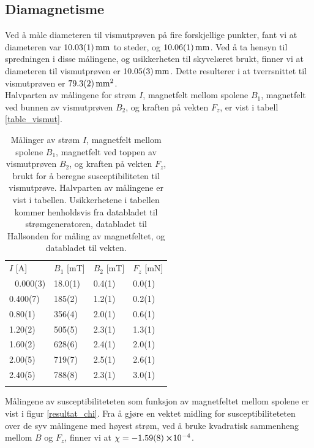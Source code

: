 \documentclass[%
 reprint,
 amsmath,amssymb,
 aps,
 norsk,
]{revtex4-1}
\begin{document}
\subsection{Diamagnetisme}
Ved å måle diameteren til vismutprøven på fire forskjellige punkter, fant vi at diameteren var $\SI{10.03\pm0.01}{\milli\meter}$ to steder, og $\SI{10.06\pm0.01}{\milli\meter}$. Ved å ta hensyn til spredningen i disse målingene, og usikkerheten til skyvelæret brukt, finner vi at diameteren til vismutprøven er $\SI{10.05\pm0.03}{\milli\meter}$. Dette resulterer i at tverrsnittet til vismutprøven er $\SI{79.3\pm0.2}{\milli\meter^2}$.\\
Halvparten av målingene for strøm $I$, magnetfelt mellom spolene $B_1$, magnetfelt ved bunnen av vismutprøven $B_2$, og kraften på vekten $F_z$, er vist i tabell \vref{table_vismut}.
\begin{table}
  \centering
  \caption{Målinger av strøm $I$, magnetfelt mellom spolene $B_1$, magnetfelt ved toppen av vismutprøven $B_2$, og kraften på vekten $F_z$, brukt for å beregne susceptibiliteten til vismutprøve. Halvparten av målingene er vist i tabellen. Usikkerhetene i tabellen kommer henholdsvis fra databladet til strømgeneratoren, databladet til Hallsonden for måling av magnetfeltet, og databladet til vekten.}
  \label{table_vismut}
    \begin{tabular}{@{}llll@{}}\botrule
    $I$ {[}A{]} & $B_1$ {[}mT{]} & $B_2$ {[}mT{]} & $F_z$ {[}mN{]} \\ \colrule 
    0.000(3)    & 18.0(1)        & 0.4(1)         & 0.0(1)      \\
    0.400(7)    & 185(2)         & 1.2(1)         & 0.2(1)      \\
    0.80(1)     & 356(4)         & 2.0(1)         & 0.6(1)      \\
    1.20(2)     & 505(5)         & 2.3(1)         & 1.3(1)        \\
    1.60(2)     & 628(6)         & 2.4(1)         & 2.0(1)        \\
    2.00(5)     & 719(7)         & 2.5(1)         & 2.6(1)        \\
    2.40(5)     & 788(8)         & 2.3(1)         & 3.0(1)        \\\botrule
    \end{tabular}
\end{table}
Målingene av susceptibiliteteten som funksjon av magnetfeltet mellom spolene er vist i figur \vref{resultat_chi}. Fra å gjøre en vektet midling for susceptibiliteteten over de syv målingene med høyest strøm, ved å bruke kvadratisk sammenheng mellom $B$ og $F_z$, finner vi at $\chi = -\SI{1.59\pm0.08}\cross 10^{-4}$.
\end{document}
